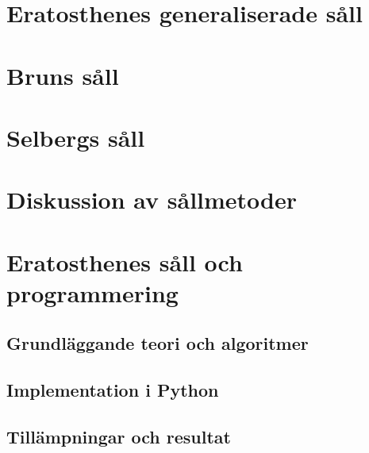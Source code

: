 \documentclass[a4paper]{article}
\begin{document}

\section{Eratosthenes generaliserade såll} \label{Eratosthenes}


\section{Bruns såll} \label{brun}


\section{Selbergs såll} \label{Selberg}


\section{Diskussion av sållmetoder}



\section{Eratosthenes såll och programmering}


\subsection{Grundläggande teori och algoritmer}


\subsection{Implementation i Python}


\subsection{Tillämpningar och resultat}

\end{document}
